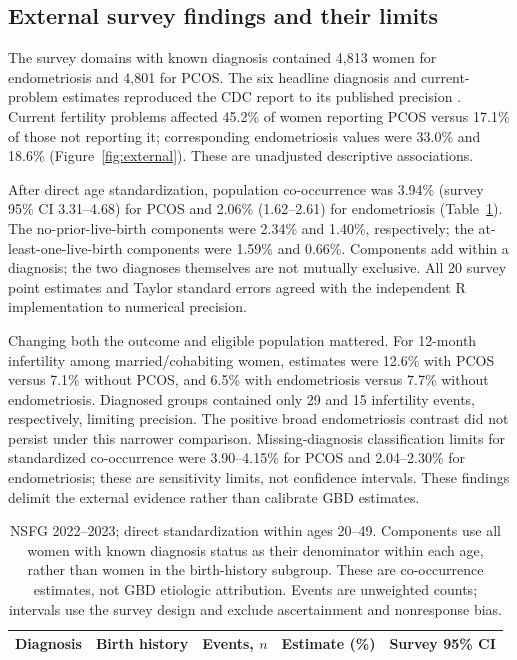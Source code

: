 \documentclass[11pt,a4paper]{article}
\begin{document}
\subsection{External survey findings and their limits}
The survey domains with known diagnosis contained 4,813 women for endometriosis and 4,801 for PCOS. The six headline diagnosis and current-problem estimates reproduced the CDC report to its published precision \cite{cdcreport}. Current fertility problems affected 45.2\% of women reporting PCOS versus 17.1\% of those not reporting it; corresponding endometriosis values were 33.0\% and 18.6\% (Figure~\ref{fig:external}). These are unadjusted descriptive associations.

After direct age standardization, population co-occurrence was 3.94\% (survey 95\% CI 3.31--4.68) for PCOS and 2.06\% (1.62--2.61) for endometriosis (Table~\ref{tab:external}). The no-prior-live-birth components were 2.34\% and 1.40\%, respectively; the at-least-one-live-birth components were 1.59\% and 0.66\%. Components add within a diagnosis; the two diagnoses themselves are not mutually exclusive. All 20 survey point estimates and Taylor standard errors agreed with the independent R implementation to numerical precision.

Changing both the outcome and eligible population mattered. For 12-month infertility among married/cohabiting women, estimates were 12.6\% with PCOS versus 7.1\% without PCOS, and 6.5\% with endometriosis versus 7.7\% without endometriosis. Diagnosed groups contained only 29 and 15 infertility events, respectively, limiting precision. The positive broad endometriosis contrast did not persist under this narrower comparison. Missing-diagnosis classification limits for standardized co-occurrence were 3.90--4.15\% for PCOS and 2.04--2.30\% for endometriosis; these are sensitivity limits, not confidence intervals. These findings delimit the external evidence rather than calibrate GBD estimates.

\begin{table}[htbp]\centering\small{}
\caption{External survey co-occurrence of diagnosis and current fertility problems.}\label{tab:external}
\begin{tabular}{llrrr}\toprule
Diagnosis & Birth history & Events, $n$ & Estimate (\%) & Survey 95\% CI\\\midrule
\end{tabular}
\caption*{NSFG 2022--2023; direct standardization within ages 20--49. Components use all women with known diagnosis status as their denominator within each age, rather than women in the birth-history subgroup. These are co-occurrence estimates, not GBD etiologic attribution. Events are unweighted counts; intervals use the survey design and exclude ascertainment and nonresponse bias.}
\end{table}
\end{document}
